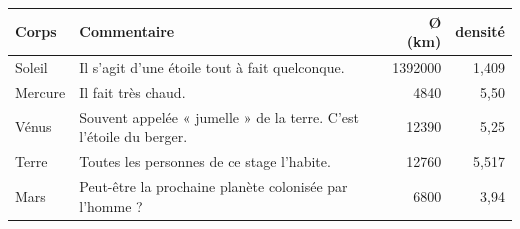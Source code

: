 \documentclass[16pt]{article}
\begin{document}
\begin{center}
\begin{tabular}{|l|>{\raggedright\arraybackslash}p{4cm}|r|r|}
\hline
\textbf{Corps} & \textbf{Commentaire} & \textbf{Ø (km)} & \textbf{densité} \\
\hline
Soleil & Il s'agit d'une étoile tout à fait quelconque. & 1392000 & 1,409 \\
\hline
Mercure & Il fait très chaud. & 4840 & 5,50 \\
\hline
Vénus & Souvent appelée « jumelle » de la terre. C'est l'étoile du berger. & 12390 & 5,25 \\
\hline
Terre & Toutes les personnes de ce stage l'habite. & 12760 & 5,517 \\
\hline
Mars & Peut-être la prochaine planète colonisée par l'homme ? & 6800 & 3,94 \\
\hline
\end{tabular}
\end{center}
\end{document}
